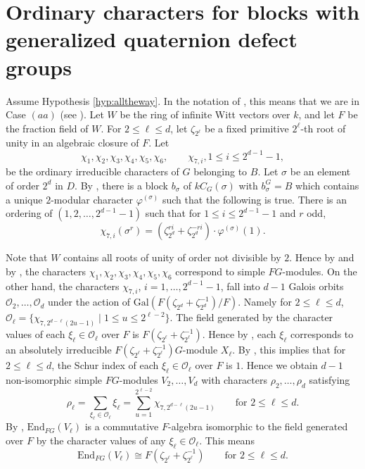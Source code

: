 \documentclass{amsart}
\theoremstyle{plain}
\theoremstyle{definition}
\theoremstyle{remark}
\begin{document}
\section{Ordinary characters for blocks with generalized quaternion defect groups}
\label{s:ordinaryquaternion}
\setcounter{equation}{0}
\setcounter{figure}{0}

Assume Hypothesis \ref{hyp:alltheway}.
In the notation of \cite[\S2]{olsson}, this means that we 
are in Case $(aa)$ (see \cite[Thm. 3.17]{olsson}).
Let $W$ be the ring of infinite Witt vectors over $k$, and
let $F$ be the fraction field of $W$.
For $2\le\ell\le d$, let $\zeta_{2^\ell}$ be a fixed primitive $2^\ell$-th root of unity 
in an algebraic closure of $F$. Let
$$\chi_1,\chi_2,\chi_3,\chi_4,\chi_5,\chi_6,\qquad \chi_{7,i}, 1\le i\le 2^{d-1}-1,$$
be the ordinary irreducible characters of $G$ belonging to $B$. Let $\sigma$ be an element of order 
$2^d$ in $D$. By \cite{olsson}, there is a block $b_\sigma$ of $kC_G(\sigma)$ with 
$b_\sigma^G=B$ which contains a unique $2$-modular character $\varphi^{(\sigma)}$ such that 
the following is true. There is an ordering of $(1,2,\ldots,2^{d-1}-1)$ such that for 
$1\le i\le 2^{d-1}-1$ and $r$ odd,
\begin{equation}
\label{eq:great1}
\chi_{7,i}(\sigma^r)=(\zeta_{2^{d}}^{ri}+\zeta_{2^{d}}^{-ri})\cdot \varphi^{(\sigma)}(1).
\end{equation}

Note that $W$ contains all roots of unity of order not divisible by $2$. Hence by \cite{olsson} and by 
\cite{fong}, the characters 
$\chi_1,\chi_2,\chi_3,\chi_4,\chi_5,\chi_6$
correspond to simple $FG$-modules. On the other hand, the characters 
$\chi_{7,i}$, $i=1,\ldots,2^{d-1}-1$,
fall into $d-1$ Galois orbits $\mathcal{O}_2,\ldots, \mathcal{O}_d$ under the action of 
$\mathrm{Gal}(F(\zeta_{2^d}+\zeta_{2^d}^{-1})/F)$. Namely for $2\le\ell\le d$, 
$\mathcal{O}_{\ell}=\{ \chi_{7,2^{d-\ell}(2u-1)} \;|\; 1\le u\le 2^{\ell-2}\}$. The field generated by the 
character values of each $\xi_\ell\in\mathcal{O}_\ell$ over $F$ is $F(\zeta_{2^\ell}+\zeta_{2^\ell}^{-1})$. 
Hence by \cite{fong}, each $\xi_\ell$ corresponds to an absolutely irreducible 
$F(\zeta_{2^\ell}+\zeta_{2^\ell}^{-1})G$-module $X_\ell$. 
By \cite[Satz V.14.9]{hup},  this implies that for $2\le\ell\le d$, the Schur index of each 
$\xi_\ell\in\mathcal{O}_\ell$ over $F$ is $1$. Hence we obtain $d-1$ non-isomorphic simple 
$FG$-modules $V_2,\ldots,V_{d}$
with characters $\rho_2,\ldots, \rho_{d}$ satisfying
\begin{equation}
\label{eq:goodchar1}
\rho_\ell =\sum_{\xi_\ell\in\mathcal{O}_\ell}\xi_\ell = 
\sum_{u=1}^{2^{\ell-2}} \chi_{7,2^{d-\ell}(2u-1)} 
\qquad\mbox{for $2\le \ell \le d$.}
\end{equation}
By \cite[Hilfssatz V.14.7]{hup}, $\mathrm{End}_{FG}(V_\ell)$ is a commutative $F$-algebra isomorphic 
to the field generated over $F$ by the character values of any $\xi_\ell\in\mathcal{O}_\ell$. 
This means
\begin{equation}
\label{eq:goodendos}
\mathrm{End}_{FG}(V_\ell)\cong F(\zeta_{2^\ell}+\zeta_{2^\ell}^{-1})\qquad\mbox{for $2\le \ell \le d$.}
\end{equation}
\end{document}
